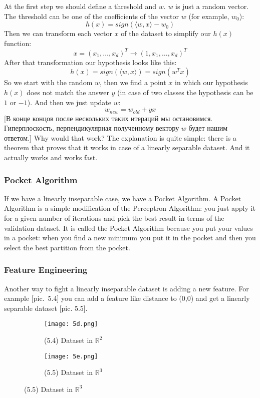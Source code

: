 At the first step we should define a threshold and $w$. $w$ is just a random vector. The threshold can be one of the coefficients of the vector $w$ (for example, $w_0$):
$$h(x)=sign\left(\langle w,x\rangle-w_0\right)$$
Then we can transform each vector $x$ of the dataset to simplify our $h(x)$ function: $$x=(x_1,\ldots,x_d)^T\to(1, x_1, \ldots, x_d)^T$$ After that transformation our hypothesis looks like this:
$$h(x)=sign\left(\langle w, x\rangle\right)=sign(w^Tx)$$
So we start with the random $w$, then we find a point $x$ in which our hypothesis $h(x)$ does not match the answer $y$ (in case of two classes the hypothesis can be $1$ or $-1$). And then we just update $w$:
$$w_{new}=w_{old}+yx$$
[В конце концов после нескольких таких итераций мы остановимся. Гиперплоскость, перпендикулярная полученному вектору $w$ будет нашим ответом.]
Why would that work? The explanation is quite simple: there is a theorem that proves that it works in case of a linearly separable dataset. {\it <Some intuition about proof of this theorem>} And it actually works and works fast.

\subsubsection*{Pocket Algorithm}

If we have a linearly inseparable case, we have a Pocket Algorithm. {\it <An example with handwritten digits dataset>} A Pocket Algorithm is a simple modification of the Perceptron Algorithm: you just apply it for a given number of iterations and pick the best result in terms of the validation dataset. It is called the Pocket Algorithm because you put your values in a pocket: when you find a new minimum you put it in the pocket and then you select the best partition from the pocket.

\hypertarget{new_features}{}
\subsubsection*{Feature Engineering}

Another way to fight a linearly inseparable dataset is adding a new feature. For example [pic.~5.4] you can add a feature like distance to (0,0) and get a linearly separable dataset [pic. 5.5].
\begin{figure}[h!]
  \centering
  \begin{subfigure}[l]{0.353\linewidth}
    \texttt{[image: 5d.png]}
    \caption*{(5.4) Dataset in $\mathbb{R}^2$}
  \end{subfigure}
  \hspace{2cm}
  \begin{subfigure}[r]{0.4\linewidth}
    \texttt{[image: 5e.png]}
    \caption*{(5.5) Dataset in $\mathbb{R}^3$}
  \end{subfigure}
\end{figure}

